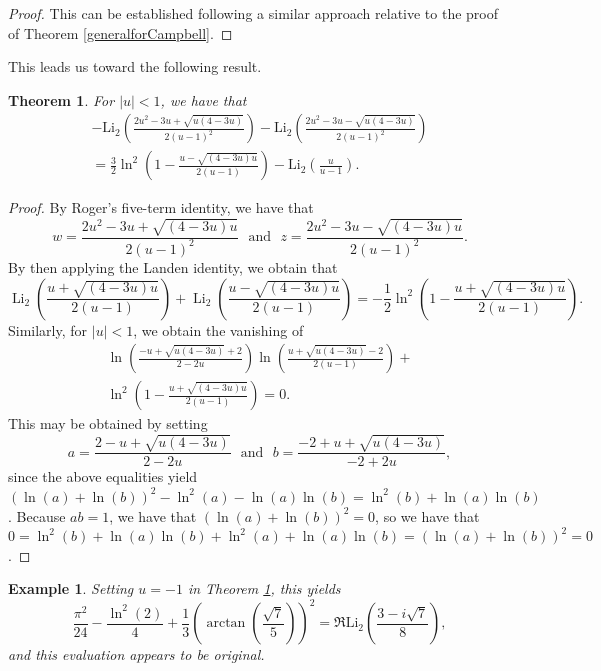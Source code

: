 \documentclass[12pt]{article}
\newtheorem{theorem}{Theorem}
\newtheorem{example}{Example}
\begin{document}
\begin{proof}
 This can be established following a similar approach relative to the proof of Theorem \ref{generalforCampbell}. 
\end{proof}

 This leads us toward the following result. 

\begin{theorem}\label{previouslymaster}
 For $ |u|<1$, we have that 
\begin{multline*}
 - \operatorname{Li_2} \left( \frac{2 u^2 - 3 u + \sqrt{ u (4-3u)}}{2 (u-1)^2} \right) 
 - \operatorname{Li_2} \left( \frac{2 u^2 - 3 u - \sqrt{ u (4-3u)}}{2 (u-1)^2} \right) \\ 
 = \frac{3}{2} \ln^2 \left( 1 - \frac{u - \sqrt{(4 - 3 u) u}}{2 (u-1)} \right) 
 - \operatorname{Li_2} \left( \frac{u}{u - 1} \right). 
\end{multline*}
\end{theorem}

\begin{proof}
 By Roger's five-term identity, we have that $$ w = \frac{2u^2 - 3u + \sqrt{(4 - 3u)u}}{2(u - 1)^2} \ \ \ \text{and} \ \ \ 
 z = \frac{2u^2 - 3u - \sqrt{(4 - 3u)u}}{2(u - 1)^2}. $$ By then applying the Landen identity, we obtain that 
 $$ \operatorname{Li}_2 \left(\frac{u + \sqrt{(4 - 3u) u}}{2 (u - 1)}\right) + \operatorname{Li}_2\left(\frac{u - 
 \sqrt{(4 - 3u) u}}{2 (u - 1)}\right) = -\frac{1}{2} \ln^2\left(1 - \frac{u + \sqrt{(4 - 3u) u}}{2 (u - 1)}\right). $$ 
 Similarly, for $ |u|<1$, we obtain the vanishing of 
\begin{multline*}
 \ln\left(\frac{-u + \sqrt{u (4-3u)} + 2}{2 - 2 u}\right) \ln\left(\frac{u + \sqrt{u (4-3u)} - 2}{2 (u - 1)}\right) + \\ 
 \ln^2\left(1 - \frac{u + \sqrt{(4 - 3 u) u}}{2 (u - 1)}\right) = 0. 
\end{multline*}
 This may be obtained by setting $$ a = \frac{2 - u + \sqrt{u(4 - 3u)}}{2 - 2u} \ \ \ \text{and} \ \ \ b = \frac{-2 + u + \sqrt{u(4 - 
 3u)}}{-2 + 2u}, $$ since the above equalities yield $(\ln(a)+\ln(b))^2-\ln^2(a)-\ln(a)\ln(b)=\ln^2(b) + 
 \ln(a)\ln(b)$. Because $ab=1$, we have that $(\ln(a)+\ln(b))^2=0$, so we have that $0= \ln^2(b)+\ln(a)\ln(b) + 
 \ln^2(a)+\ln(a)\ln(b)=(\ln(a)+\ln(b))^2=0$. 
\end{proof}

\begin{example}
 Setting $u=-1$ in Theorem \ref{previouslymaster}, this yields 
\begin{equation*}
\frac{\pi^2}{24} - \frac{ \ln^2(2)}{4} + \frac{1}{3} \left(\operatorname{arctan} 
 \left(\frac{\sqrt{7}}{5}\right) \right)^2 = \Re\mathrm{Li}_2 \left(\frac{3 - i \sqrt{7}}{8} \right), 
\end{equation*}
 and this evaluation appears to be original. 
\end{example}
\end{document}
